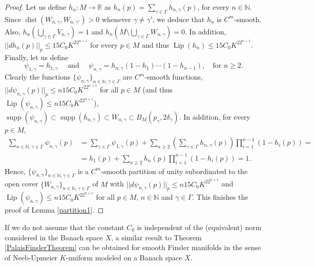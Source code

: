 \documentclass[11pt]{amsart}
\numberwithin{equation}{section}
\begin{document}
\begin{proof}
Let us  define $h_n: M\rightarrow \mathbb R$ as $h_n(p)=\sum_{\gamma\in\Gamma} h_{n,\gamma}(p)$, for every $n\in\mathbb{N}$.  Since ${\operatorname{dist}}(W_{n,\gamma},W_{n,\gamma'})>0$ whenever $\gamma\neq \gamma'$, we deduce that $h_n$ is $C^m$-smooth. Also, $h_n(\bigcup_{\gamma\in\Gamma} V_{n,\gamma})=1$ and $h_n(M\setminus \bigcup_{\gamma\in \Gamma} W_{n,\gamma})=0$. In addition, $||dh_n(p)||_p\le 15 C_0K^22^{n+1}$ for every $p\in M$ and thus  ${\operatorname{Lip}}(h_n)\le  15 C_0K^22^{n+1}$.
Finally, let us define
\begin{equation*}
\psi_{1,\gamma}=h_{1,\gamma} \quad \text{ and }  \quad  \psi_{n,\gamma}=h_{n,\gamma}(1-h_1)\cdots(1-h_{n-1}), \quad
 \text{for }  n\ge 2.
 \end{equation*}
Clearly the functions $\{ \psi_{n,\gamma}\}_{n\in \mathbb N, \gamma \in \Gamma}$ are  $C^m$-smooth functions,
$||d\psi_{n,\gamma}(p)||_p \le  n15 C_0K^22^{n+1}$ for all $p \in M$  (and thus
${\operatorname{Lip}}(\psi_{n,\gamma}) \le  n15 C_0K^22^{n+1}$),
${\operatorname{supp}} (\psi_{n,\gamma})\subset {\operatorname{supp}} (h_{n,\gamma})\subset W_{n,\gamma}\subset B_M(p_\gamma,2\delta_\gamma)$.
In addition, for every $p\in M$,
\begin{align*}
\sum_{n\in\mathbb{N},\gamma\in\Gamma} \psi_{n,\gamma}(p)&=\sum_{\gamma\in\Gamma} \psi_{1,\gamma}(p)+
\sum_{n\ge 2}\left(\sum_{\gamma\in\Gamma}h_{n,\gamma}(p)\right)\prod_{i=1}^{n-1}(1-h_i(p))=\\
&= h_1(p)+\sum_{n\ge2} h_n(p)\prod_{i=1}^{n-1}(1-h_i(p))=1.
\end{align*}
Hence,  $\{\psi_{n,\gamma}\}_{n\in\mathbb{N},\gamma\in\Gamma}$ is a $C^m$-smooth  partition of unity subordinated to the open cover $\{W_{n,\gamma}\}_{n\in\mathbb{N},\gamma\in\Gamma}$ of $M$ with  $||d\psi_{n,\gamma}(p)||_p
\le n15 C_0K^22^{n+1}$ and ${\operatorname{Lip}}(\psi_{n,\gamma})\le  n15 C_0K^22^{n+1}$  for all $p\in M$,  $n\in \mathbb N$ and
$\gamma \in \Gamma$. This finishes the proof of Lemma \ref{partition1}. \end{proof}

If we do not assume that the constant $C_0$ is independent of the (equivalent) norm considered in the Banach space $X$, a  similar result to Theorem \ref{PalaisFinslerTheorem} can be obtained for smooth Finsler manifolds in the sense of Neeb-Upmeier $K$-uniform  modeled on a Banach space $X$.
\end{document}
